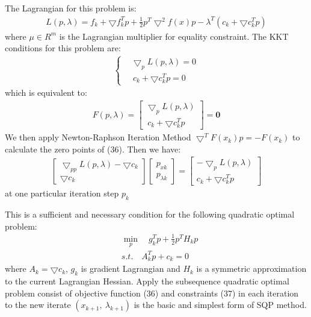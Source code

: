 \documentclass{article}
\begin{document}
\begin{spacing}{1.5}
The Lagrangian for this problem is:
\begin{align}
L(p,\lambda)=f_k+\bigtriangledown f_k^Tp+\frac{1}{2}p^T\bigtriangledown^2f(x)p-\lambda^T(c_k+\bigtriangledown c_k^Tp)
\end{align}
where $\mu\in R^m$ is the Lagrangian multiplier for equality constraint. The KKT conditions for this problem are:
\begin{align}
\left\{
\begin{aligned}
&\bigtriangledown_pL(p,\lambda)=0\\
&\ c_k+\bigtriangledown c_k^Tp=0
\end{aligned}
\right.
\end{align}
which is equivalent to:
\begin{align}
F(p,\lambda)=
\begin{bmatrix}
\bigtriangledown_pL(p,\lambda)\\
\ c_k+\bigtriangledown c_k^Tp
\end{bmatrix}
=\bm{0}
\end{align}
We then apply Newton-Raphson Iteration Method $\bigtriangledown^TF(x_k)p=-F(x_k)$ to calculate the zero points of (36). Then we have:
\begin{align}
\begin{bmatrix}
\bigtriangledown_{pp}L(p,\lambda)-\bigtriangledown c_k\\
\bigtriangledown c_k
\end{bmatrix}
\begin{bmatrix}
p_{xk}\\
p_{\lambda k}
\end{bmatrix}
=
\begin{bmatrix}
-\bigtriangledown_pL(p,\lambda)\\
c_k+\bigtriangledown c_k^Tp
\end{bmatrix}
\end{align}
at one particular iteration step $p_k$

\noindent This is a sufficient and necessary condition for the following quadratic optimal problem:
\begin{align}
&\min_p\quad g_k^Tp+\frac{1}{2}p^TH_kp\\
&s.t.\quad A_k^Tp+c_k=0
\end{align}
where $A_k=\bigtriangledown c_k$, $g_k$ is gradient Lagrangian and $H_k$ is a symmetric approximation to the current Lagrangian Hessian.
Apply the subsequence quadratic optimal problem consist of objective function (36) and constraints (37) in each iteration to the new iterate $(x_{k+1},\ \lambda_{k+1})$ is the basic and simplest form of SQP method.\par


\end{spacing}
\end{document}
